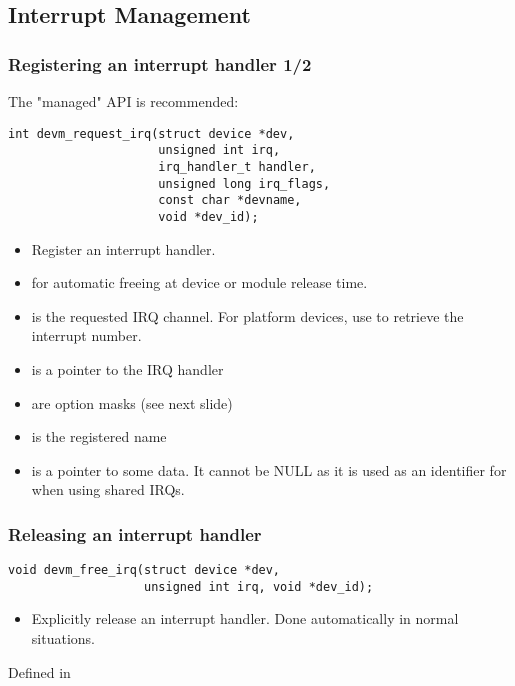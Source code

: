 \subsection{Interrupt Management}

\begin{frame}[fragile]
  \frametitle{Registering an interrupt handler 1/2}
  The "managed" API is recommended:
  \begin{verbatim}
int devm_request_irq(struct device *dev,
                     unsigned int irq,
                     irq_handler_t handler,
                     unsigned long irq_flags,
                     const char *devname,
                     void *dev_id);
  \end{verbatim}
  \begin{itemize}
  \item Register an interrupt handler.
  \item {} for automatic freeing at device or module
        release time.
  \item {} is the requested IRQ channel. For platform
        devices, use  to retrieve the
        interrupt number.
  \item {} is a pointer to the IRQ handler
  \item {} are option masks (see next slide)
  \item {} is the registered name
  \item {\small {} is a pointer to some data. It cannot be NULL
        as it is used as an identifier for  when using
      shared IRQs.}
  \end{itemize}
\end{frame}

\begin{frame}[fragile]
  \frametitle{Releasing an interrupt handler}
  \begin{verbatim}
void devm_free_irq(struct device *dev,
                   unsigned int irq, void *dev_id);
  \end{verbatim}
  \begin{itemize}
  \item Explicitly release an interrupt handler. Done automatically
        in normal situations.
  \end{itemize}
  Defined in 
\end{frame}

